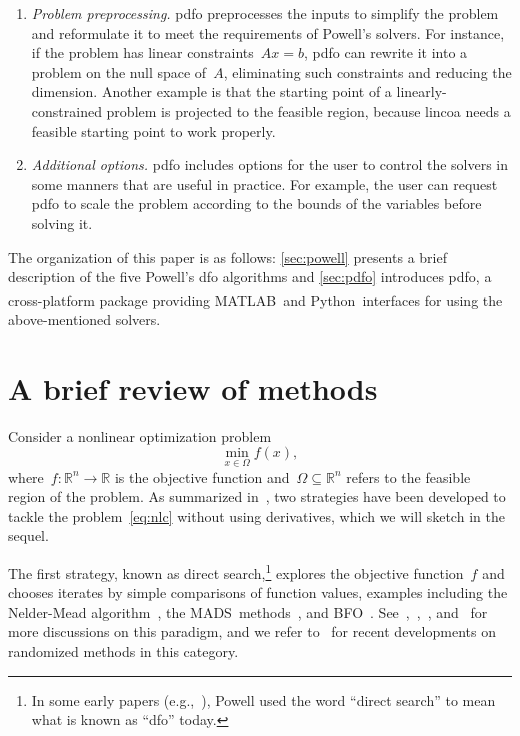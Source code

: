 \documentclass[11pt,draft]{article}
\numberwithin{equation}{section}
\def\R{\ensuremath{\mathds{R}}}
\def\obj{\ensuremath{f}}
\def\srchsp{\ensuremath{\Omega}}
\def\bfo{\mbox{BFO}}
\def\mads{\mbox{MADS}}
\def\matlab{\mbox{MATLAB\textsuperscript{\textregistered}}}
\def\python{\mbox{Python}}
\begin{document}
\begin{enumerate}
    \item \emph{Problem preprocessing.}
    \gls{pdfo} preprocesses the inputs to simplify the problem and reformulate it to meet the requirements of Powell's solvers.
    For instance, if the problem has linear constraints~$A x = b$, \gls{pdfo} can rewrite it into a problem on the null space of~$A$, eliminating such constraints and reducing the dimension.
    Another example is that the starting point of a linearly-constrained problem is projected to the feasible region, because \gls{lincoa} needs a feasible starting point to work properly.

    \item \emph{Additional options.}
    \gls{pdfo} includes options for the user to control the solvers in some manners that are useful in practice.
    For example, the user can request \gls{pdfo} to scale the problem according to the bounds of the variables before solving it.

\end{enumerate}

The organization of this paper is as follows: \cref{sec:powell} presents a brief description of the five Powell's \gls{dfo} algorithms and \cref{sec:pdfo} introduces \gls{pdfo}, a cross-platform package providing \matlab\ and \python\ interfaces for using the above-mentioned solvers.

\section{A brief review of  methods}

Consider a nonlinear optimization problem
\begin{equation}
    \label{eq:nlc}
    \min_{x \in \srchsp} \obj(x),
\end{equation}
where~$\obj \colon \R^n \to \R$ is the objective function and~$\srchsp \subseteq \R^n$ refers to the feasible region of the problem.
As summarized in~\cite{Conn_Scheinberg_Vicente_2009b}, two strategies have been developed to tackle the problem~\eqref{eq:nlc} without using derivatives, which we will sketch in the sequel.

The first strategy, known as direct search,\footnote{In some early papers (e.g.,~\cite{Powell_1994,Powell_1998}), Powell used the word \enquote{direct search} to mean what is known as \enquote{\gls{dfo}} today.} explores the objective function~$\obj$ and chooses iterates by simple comparisons of function values, examples including the Nelder-Mead algorithm~\cite{Nelder_Mead_1965}, the \mads\ methods~\cite{Audet_Dennis_2006,Abramson_Audet_2006,Digabel_2011}, and \bfo~\cite{Porcelli_Toint_2017,Porcelli_Toint_2020,Porcelli_Toint_2021}.
See~\cite{Kolda_Lewis_Torczon_2003},~\cite[Chapters~7 and~8]{Conn_Scheinberg_Vicente_2009b},~\cite[Part~3]{Audet_Hare_2017}, and~\cite[Section~2.1]{Larson_Menickelly_Wild_2019} for more discussions on this paradigm, and we refer to~\cite{Gratton_Etal_2015,Gratton_Etal_2019} for recent developments on randomized methods in this category.
\end{document}
